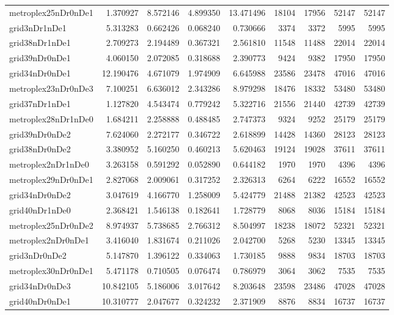 \begin{longtable}{|l|r|r|r|r|r|r|r|r|}
metroplex25nDr0nDe1 & 1.370927 & 8.572146 & 4.899350 & 13.471496 & 18104 & 17956 & 52147 & 52147 \\
grid3nDr1nDe1 & 5.313283 & 0.662426 & 0.068240 & 0.730666 & 3374 & 3372 & 5995 & 5995 \\
grid38nDr1nDe1 & 2.709273 & 2.194489 & 0.367321 & 2.561810 & 11548 & 11488 & 22014 & 22014 \\
grid39nDr0nDe1 & 4.060150 & 2.072085 & 0.318688 & 2.390773 & 9424 & 9382 & 17950 & 17950 \\
grid34nDr0nDe1 & 12.190476 & 4.671079 & 1.974909 & 6.645988 & 23586 & 23478 & 47016 & 47016 \\
metroplex23nDr0nDe3 & 7.100251 & 6.636012 & 2.343286 & 8.979298 & 18476 & 18332 & 53480 & 53480 \\
grid37nDr1nDe1 & 1.127820 & 4.543474 & 0.779242 & 5.322716 & 21556 & 21440 & 42739 & 42739 \\
metroplex28nDr1nDe0 & 1.684211 & 2.258888 & 0.488485 & 2.747373 & 9324 & 9252 & 25179 & 25179 \\
grid39nDr0nDe2 & 7.624060 & 2.272177 & 0.346722 & 2.618899 & 14428 & 14360 & 28123 & 28123 \\
grid38nDr0nDe2 & 3.380952 & 5.160250 & 0.460213 & 5.620463 & 19124 & 19028 & 37611 & 37611 \\
metroplex2nDr1nDe0 & 3.263158 & 0.591292 & 0.052890 & 0.644182 & 1970 & 1970 & 4396 & 4396 \\
metroplex29nDr0nDe1 & 2.827068 & 2.009061 & 0.317252 & 2.326313 & 6264 & 6222 & 16552 & 16552 \\
grid34nDr0nDe2 & 3.047619 & 4.166770 & 1.258009 & 5.424779 & 21488 & 21382 & 42523 & 42523 \\
grid40nDr1nDe0 & 2.368421 & 1.546138 & 0.182641 & 1.728779 & 8068 & 8036 & 15184 & 15184 \\
metroplex25nDr0nDe2 & 8.974937 & 5.738685 & 2.766312 & 8.504997 & 18238 & 18072 & 52321 & 52321 \\
metroplex2nDr0nDe1 & 3.416040 & 1.831674 & 0.211026 & 2.042700 & 5268 & 5230 & 13345 & 13345 \\
grid3nDr0nDe2 & 5.147870 & 1.396122 & 0.334063 & 1.730185 & 9888 & 9834 & 18703 & 18703 \\
metroplex30nDr0nDe1 & 5.471178 & 0.710505 & 0.076474 & 0.786979 & 3064 & 3062 & 7535 & 7535 \\
grid34nDr0nDe3 & 10.842105 & 5.186006 & 3.017642 & 8.203648 & 23598 & 23486 & 47028 & 47028 \\
grid40nDr0nDe1 & 10.310777 & 2.047677 & 0.324232 & 2.371909 & 8876 & 8834 & 16737 & 16737 \\

\end{longtable}
